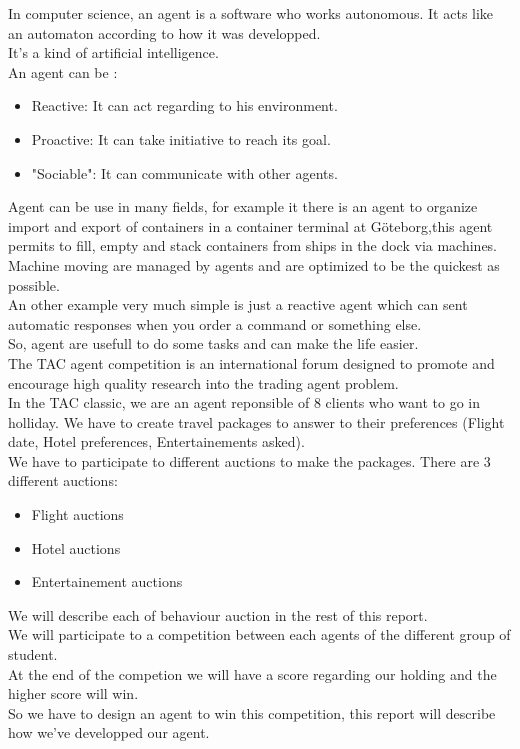 In computer science, an agent is a software who works autonomous. It acts like an automaton according to how it was developped.\\
 It's a kind of artificial intelligence.\\
  An agent can be :\\
\begin{itemize}
	\item Reactive: It can act regarding to his environment.
	\item Proactive: It can take initiative to reach its goal.
	\item "Sociable": It can communicate with other agents.
\end{itemize}
Agent can be use in many fields, for example it there is an agent to organize import and export of containers in a container terminal at Göteborg,this agent permits to fill, empty and stack containers from ships in the dock via machines. Machine moving are managed by agents and are optimized to be the quickest as possible.\\
An other example very much simple is just a reactive agent which can sent automatic responses when you order a command or something else.\\
So, agent are usefull to do some tasks and can make the life easier.\\
The TAC agent competition is an international forum designed to promote and encourage high quality research into the trading agent problem.\\
In the TAC classic, we are an agent reponsible of 8 clients who want to go in holliday. We have to create travel packages to answer to their preferences (Flight date, Hotel preferences, Entertainements asked).\\
We have to participate to different auctions to make the packages. There are 3 different auctions:\\
\begin{itemize}
\item Flight auctions
\item Hotel auctions
\item Entertainement auctions
\end{itemize}
We will describe each of behaviour auction in the rest of this report.\\
We will participate to a competition between each agents of the different group of student.\\
At the end of the competion we will have a score regarding our holding and the higher score will win.\\
So we have to design an agent to win this competition, this report will describe how we've developped our agent.